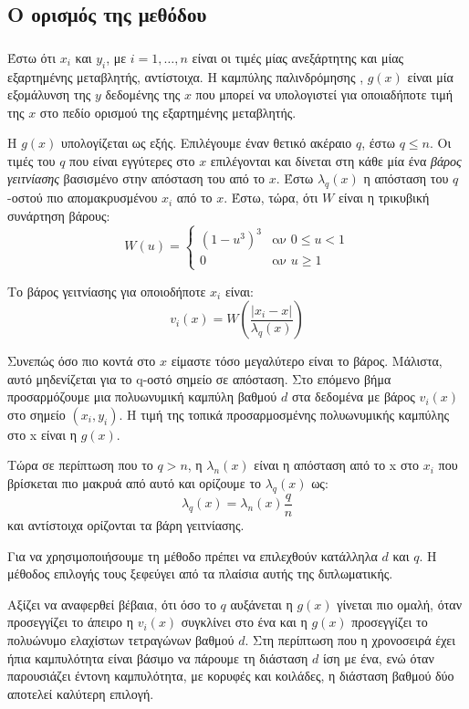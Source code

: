 \subsection{Ο ορισμός της μεθόδου }

\subsubsection{}
Έστω ότι $x_i$ και $y_i$, με $i= 1,\dots,n$ είναι οι τιμές μίας ανεξάρτητης και μίας εξαρτημένης μεταβλητής, αντίστοιχα. Η καμπύλης παλινδρόμησης , $g(x)$ είναι μία εξομάλυνση της $y$ δεδομένης της $x$ που μπορεί να υπολογιστεί για οποιαδήποτε τιμή της $x$ στο πεδίο ορισμού της εξαρτημένης μεταβλητής.  

H $g(x)$ υπολογίζεται ως εξής. Επιλέγουμε έναν θετικό ακέραιο $q$, έστω $ q \leq n$.
Οι τιμές του $q$ που είναι εγγύτερες στο $x$ επιλέγονται και δίνεται στη κάθε μία ένα \textit{βάρος γειτνίασης} βασισμένο στην απόσταση του από το $x$. Έστω $\lambda_q(x)$ η απόσταση του $q$-οστού πιο απομακρυσμένου $x_i$ από το $x$. Έστω, τώρα, ότι $W$ είναι η τρικυβική συνάρτηση βάρους:
\begin{equation}
W(u) =
\left\{
	\begin{array}{ll}
		(1 - u^3)^3  & \mbox{αν } 0 \leq u < 1 \\
		0 & \mbox{αν } u \geq 1
	\end{array}
\right.
\end{equation}

Το βάρος γειτνίασης για οποιοδήποτε $x_i$ είναι:
\[ v_i(x) = W(\frac{|x_i - x|}{ \lambda_q(x)})\]

Συνεπώς όσο πιο κοντά στο $x$ είμαστε τόσο μεγαλύτερο είναι το βάρος. Μάλιστα, αυτό μηδενίζεται για το q-οστό σημείο σε απόσταση. Στο επόμενο βήμα προσαρμόζουμε μια πολυωνυμική καμπύλη βαθμού $d$ στα δεδομένα με βάρος $v_i(x)$ στο σημείο $(x_i, y_i)$. Η τιμή της τοπικά προσαρμοσμένης πολυωνυμικής καμπύλης στο x είναι η $g(x)$. 

Τώρα σε περίπτωση που το $q > n$, η $\lambda_n(x)$ είναι η απόσταση από το x στο $x_i$ που βρίσκεται πιο μακρυά από αυτό και ορίζουμε το $\lambda_q(x)$ ως:
\[\lambda_q(x) = \lambda_n(x)\frac{q}{n}\]
και αντίστοιχα ορίζονται τα βάρη γειτνίασης. 

Για να χρησιμοποιήσουμε τη μέθοδο  πρέπει να επιλεχθούν κατάλληλα $d$ και $q$. Η μέθοδος επιλογής τους ξεφεύγει από τα πλαίσια αυτής της διπλωματικής.

Αξίζει να αναφερθεί βέβαια, ότι όσο το $q$ αυξάνεται η $g(x)$ γίνεται πιο ομαλή, όταν προσεγγίζει το άπειρο η $v_i(x)$ συγκλίνει στο ένα και η $g(x)$ προσεγγίζει το πολυώνυμο ελαχίστων τετραγώνων βαθμού $d$. Στη περίπτωση που η χρονοσειρά έχει ήπια καμπυλότητα είναι βάσιμο να πάρουμε τη διάσταση $d$ ίση με ένα, ενώ όταν παρουσιάζει έντονη καμπυλότητα, με κορυφές και κοιλάδες, η διάσταση βαθμού δύο αποτελεί καλύτερη επιλογή.

